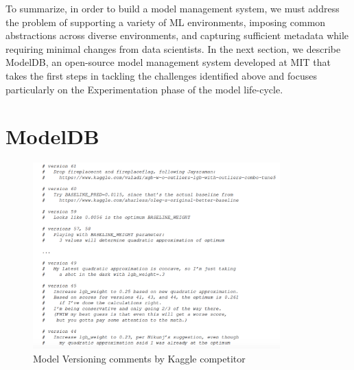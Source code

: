 \documentclass[11pt]{article}
\newcommand{\mdb}{{\sc ModelDB}\xspace}
\newcommand{\dss}{data scientists\xspace}
\begin{document}
To summarize, in order to build a model management system, we must address the problem of supporting a variety of ML environments, imposing common abstractions across diverse environments, and capturing sufficient metadata while requiring minimal changes from \dss.
In the next section, we describe \mdb, an open-source model management system developed at MIT that takes the first steps in tackling the challenges identified above and focuses particularly on the Experimentation phase of the model life-cycle.

\section{\mdb}
\label{sec:modeldb}

\begin{figure}[tb] 
\centerline{
\includegraphics[trim=0mm 0mm 0mm 0mm,
width=0.85\textwidth,clip=true]{figs/listing.png}}
\caption{Model Versioning comments by Kaggle competitor}
\label{lst:versioning_2}
\end{figure}
\end{document}
